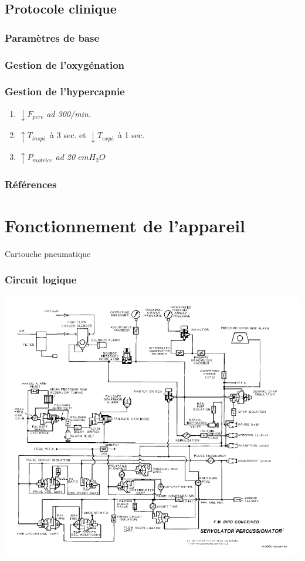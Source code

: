 \documentclass[aspectratio=169]{beamer}
\begin{document}
\subsection{Protocole clinique}

\begin{frame}
	\frametitle{Paramètres de base}
	\centering
	
\end{frame}

\begin{frame}
	\frametitle{Gestion de l'oxygénation}
	\centering
	
\end{frame}

\begin{frame}
	\frametitle{Gestion de l'hypercapnie}
	\centering
	\begin{enumerate}
		\item $\downarrow F_{perc}$ \it{ad} 300/min.
		\item $\uparrow T_{inspi.}$ à 3 sec. et $\downarrow T_{expi.}$ à 1 sec.
		\item $\uparrow P_{motrice}$ \it{ad} 20 $cmH_2O$
	\end{enumerate}
\end{frame}

\begin{frame}
\frametitle{Références}
	\printbibliography{}
\end{frame}

\appendix

\section{Fonctionnement de l'appareil}

\begin{frame}{Cartouche pneumatique}
	
\end{frame}

\begin{frame}[b]
	\frametitle{Circuit logique}
	\centering
	\includegraphics[height=\textheight]{img/circuit-logique.pdf}
\end{frame}
\end{document}
